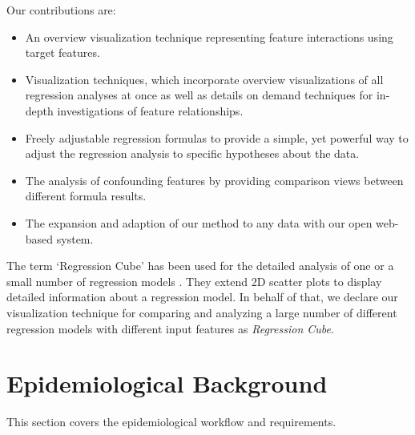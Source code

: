 \documentclass[journal]{style/vgtc} 			          %
\begin{document}
Our contributions are:
\begin{itemize}
	\item An overview visualization technique representing feature interactions using target features.
	\item Visualization techniques, which incorporate overview visualizations of all regression analyses at once as well as details on demand techniques for in-depth investigations of feature relationships.
	\item Freely adjustable regression formulas to provide a simple, yet powerful way to adjust the regression analysis to specific hypotheses about the data.
	\item The analysis of confounding features by providing comparison views between different formula results.
	\item The expansion and adaption of our method to any data with our open web-based system.
\end{itemize}
The term `Regression Cube' has been used for the detailed analysis of one or a small number of regression models \cite{Ahmadi, Chan}.
They extend 2D scatter plots to display detailed information about a regression model.
In behalf of that, we declare our visualization technique for comparing and analyzing a large number of different regression models with different input features as \emph{Regression Cube}.
\section{Epidemiological Background} \label{sec:Background}
This section covers the epidemiological workflow and requirements.
\end{document}
